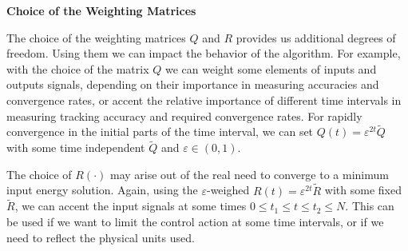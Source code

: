\textbf{Choice of the Weighting Matrices}

The choice of the weighting matrices $Q$ and $R$ provides us additional degrees of freedom. 
Using them we can impact the behavior of the algorithm. For example, with the choice of the matrix $Q$ we can weight some elements of inputs and outputs signals, depending on their importance in measuring accuracies and convergence rates, or accent the relative importance of different time intervals in measuring tracking accuracy and required convergence rates. For rapidly convergence in the initial parts of the time interval, we can set $Q(t) = \varepsilon^{2t}\tilde{Q}$ with some time independent $\tilde{Q}$ and $\varepsilon \in (0,1)$. 

The choice of $R(\cdot)$ may arise out of the real need to converge to a minimum input energy solution. 
Again, using the $\varepsilon$-weighed $R(t) = \varepsilon^{2t}\tilde{R}$ with some fixed $\tilde{R}$, we can accent the input signals at some times $0\leq t_1 \leq t \leq t_2 \leq N$. This can be used if we want to limit the control action at some time intervals, or if we need to reflect the physical units used. 

